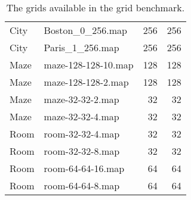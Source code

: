 \begin{table}[]
\begin{tabular}{@{}llrr@{}}
City     & Boston\_0\_256.map        & 256    & 256   \\
City     & Paris\_1\_256.map         & 256    & 256   \\
Maze     & maze-128-128-10.map       & 128    & 128   \\
Maze & maze-128-128-2.map        & 128    & 128   \\
Maze     & maze-32-32-2.map          & 32     & 32    \\
Maze     & maze-32-32-4.map          & 32     & 32    \\
Room     & room-32-32-4.map          & 32     & 32    \\
Room     & room-32-32-8.map          & 32     & 32    \\
Room     & room-64-64-16.map         & 64     & 64    \\
Room     & room-64-64-8.map          & 64     & 64    \\
\bottomrule
\end{tabular}
\caption{The grids available in the grid \mapf benchmark.}
\label{tab:gridmaps}
\end{table}

